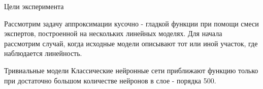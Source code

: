 \documentclass{beamer}
\begin{document}
\begin{frame}{Цели эксперимента}

    Рассмотрим задачу аппроксимации кусочно - гладкой функции   при помощи смеси экспертов, построенной на нескольких линейных моделях. Для начала рассмотрим случай, когда исходные модели описывают тот или иной участок, где наблюдается линейность.  
\begin{figure}[!htb]
      \end{figure}

\end{frame}

\begin{frame}{Тривиальные модели}
Классические нейронные сети приближают функцию только при достаточно большом количестве нейронов  в слое - порядка 500.
\begin{figure}[!htb]
      \end{figure}

\end{frame}
\end{document}
